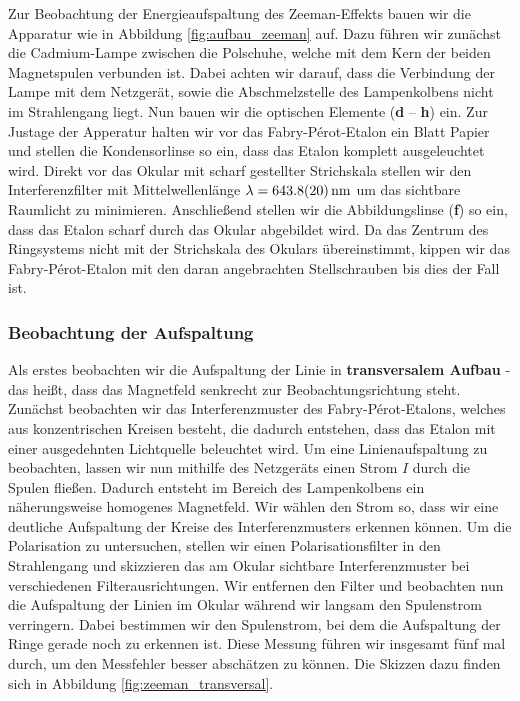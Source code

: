 \documentclass[11pt, a4paper]{article}
\begin{document}
Zur Beobachtung der Energieaufspaltung des Zeeman-Effekts bauen wir die Apparatur wie in Abbildung \ref{fig:aufbau_zeeman} auf.
Dazu führen wir zunächst die Cadmium-Lampe zwischen die Polschuhe, welche mit dem Kern der beiden Magnetspulen verbunden ist.
Dabei achten wir darauf, dass die Verbindung der Lampe mit dem Netzgerät, sowie die Abschmelzstelle des Lampenkolbens nicht im Strahlengang liegt.
Nun bauen wir die optischen Elemente (\textbf{d} -- \textbf{h}) ein.
Zur Justage der Apperatur halten wir vor das Fabry-Pérot-Etalon ein Blatt Papier und stellen die Kondensorlinse so ein, dass das Etalon komplett ausgeleuchtet wird.
Direkt vor das Okular mit scharf gestellter Strichskala stellen wir den Interferenzfilter mit Mittelwellenlänge $\lambda = \SI{643,8 +- 2}{\nano\metre}$ um das sichtbare Raumlicht zu minimieren.
Anschließend stellen wir die Abbildungslinse (\textbf{f}) so ein, dass das Etalon scharf durch das Okular abgebildet wird.
Da das Zentrum des Ringsystems nicht mit der Strichskala des Okulars übereinstimmt, kippen wir das Fabry-Pérot-Etalon mit den daran angebrachten Stellschrauben bis dies der Fall ist.

\subsubsection{Beobachtung der Aufspaltung}
Als erstes beobachten wir die Aufspaltung der Linie in \textbf{transversalem Aufbau} - das heißt, dass das Magnetfeld senkrecht zur Beobachtungsrichtung steht.
Zunächst beobachten wir das Interferenzmuster des Fabry-Pérot-Etalons, welches aus konzentrischen Kreisen besteht, die dadurch entstehen, dass das Etalon mit einer ausgedehnten Lichtquelle beleuchtet wird.
Um eine Linienaufspaltung zu beobachten, lassen wir nun mithilfe des Netzgeräts einen Strom $I$ durch die Spulen fließen.
Dadurch entsteht im Bereich des Lampenkolbens ein näherungsweise homogenes Magnetfeld.
Wir wählen den Strom so, dass wir eine deutliche Aufspaltung der Kreise des Interferenzmusters erkennen können.
Um die Polarisation zu untersuchen, stellen wir einen Polarisationsfilter in den Strahlengang und skizzieren das am Okular sichtbare Interferenzmuster bei verschiedenen Filterausrichtungen.
Wir entfernen den Filter und beobachten nun die Aufspaltung der Linien im Okular während wir langsam den Spulenstrom verringern.
Dabei bestimmen wir den Spulenstrom, bei dem die Aufspaltung der Ringe gerade noch zu erkennen ist.
Diese Messung führen wir insgesamt fünf mal durch, um den Messfehler besser abschätzen zu können.
Die Skizzen dazu finden sich in Abbildung \ref{fig:zeeman_transversal}.
\end{document}
